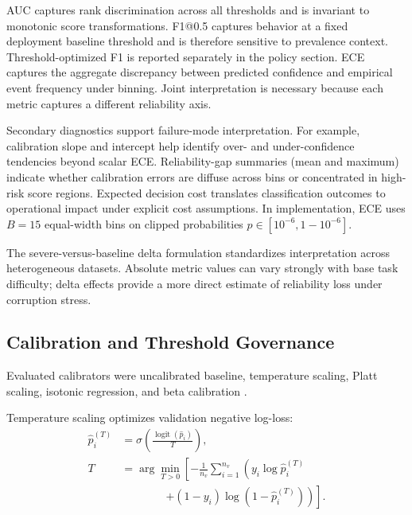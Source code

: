 \documentclass{AuthorGuide/ijitcs}
\begin{document}
AUC captures rank discrimination across all thresholds and is invariant to monotonic score transformations. F1@0.5 captures behavior at a fixed deployment baseline threshold and is therefore sensitive to prevalence context. Threshold-optimized F1 is reported separately in the policy section. ECE captures the aggregate discrepancy between predicted confidence and empirical event frequency under binning. Joint interpretation is necessary because each metric captures a different reliability axis.

Secondary diagnostics support failure-mode interpretation. For example, calibration slope and intercept help identify over- and under-confidence tendencies beyond scalar ECE. Reliability-gap summaries (mean and maximum) indicate whether calibration errors are diffuse across bins or concentrated in high-risk score regions. Expected decision cost translates classification outcomes to operational impact under explicit cost assumptions. In implementation, ECE uses $B=15$ equal-width bins on clipped probabilities $p \in [10^{-6}, 1 - 10^{-6}]$.

The severe-versus-baseline delta formulation standardizes interpretation across heterogeneous datasets. Absolute metric values can vary strongly with base task difficulty; delta effects provide a more direct estimate of reliability loss under corruption stress.

\subsection{Calibration and Threshold Governance}
Evaluated calibrators were uncalibrated baseline, temperature scaling, Platt scaling, isotonic regression, and beta calibration \cite{platt2000probabilities,zadrozny2002transforming,niculescu2005predicting,guo2017calibration,kull2017beta}.

Temperature scaling optimizes validation negative log-loss:
\begin{equation}
\begin{aligned}
\hat{p}^{(T)}_i
&=
\sigma\!\left(\frac{\operatorname{logit}(\hat{p}_i)}{T}\right), \\
T
&=
\arg\min_{T>0}
\left[
-\frac{1}{n_v}\sum_{i=1}^{n_v}
\left(
y_i\log \hat{p}^{(T)}_i
\right.\right. \\
&\qquad\qquad\left.\left.
+ (1-y_i)\log\!\left(1-\hat{p}^{(T)}_i\right)
\right)
\right].
\end{aligned}
\label{eq:temperature}
\end{equation}
\end{document}

